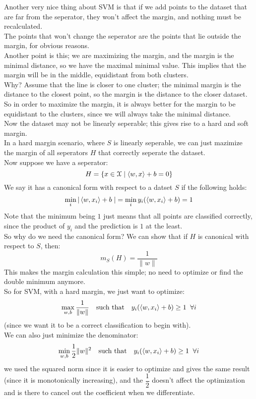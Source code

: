 \documentclass[12pt]{article}
\begin{document}
Another very nice thing about SVM is that if we add
points to the dataset that are far from the seperator,
they won't affect the margin, and nothing must be
recalculated. \\
The points that won't change the seperator 
are the points that lie outside the margin,
for obvious reasons. \\

Another point is this; we are maximizing the margin,
and the margin is the minimal distance, so we have the
maximal minimal value. This implies that the margin
will be in the middle, equidistant from both clusters. \\
Why? Assume that the line is closer to one cluster;
the minimal margin is the distance to the closest point,
so the margin is the distance to the closer dataset.
So in order to maximize the margin,
it is always better for the margin to be equidistant
to the clusters,
since we will always take the minimal distance. \\

Now the dataset may not be linearly seperable;
this gives rise to a hard and soft margin. \\

In a hard margin scenario, where
$S$ is linearly seperable, we can just
mazimize the margin of all seperators $H$
that correctly seperate the dataset. \\

Now suppose we have a seperator:
\[ H = \{ x \in \mathcal{X} \mid \left\langle w, x \right\rangle + b = 0 \} \]
We say it has a canonical form with respect
to a datset $S$ if the following holds:
\[ \min_i |\left\langle w, x_i \right\rangle + b \; |
= \min_i y_i(\left\langle w, x_i \right\rangle + b) = 1 \]
Note that the minimum being $1$ just means
that all points are classified correctly,
since the product of $y_i$
and the prediction is $1$ at the least. \\

So why do we need the canonical form?
We can show that if $H$ is canonical
with respect to $S$, then:
\[ m_S(H) = \dfrac{1}{\|w\|} \]
This makes the margin calculation this simple;
no need to optimize or find the double minimum anymore. \\

So for SVM, with a hard margin, we just want to
optimize:
\[ \max_{w, b} \dfrac{1}{\|w\|} \quad \text{such that}
\quad y_i(\left\langle w, x_i \right\rangle + b) \geq 1 \;\; \forall i \]
(since we want it to be a correct classification
to begin with). \\

We can also just minimize the denominator:
\[ \min_{w, b} \dfrac{1}{2}\|w\|^2 \quad \text{such that}
\quad y_i(\left\langle w, x_i \right\rangle + b) \geq 1 \;\; \forall i \]
we used the squared norm since it is easier to 
optimize and gives the same result
(since it is monotonically increasing),
and the $\dfrac{1}{2}$ doesn't affect the optimization
and is there to cancel out the coefficient when we
differentiate. \\
\end{document}
